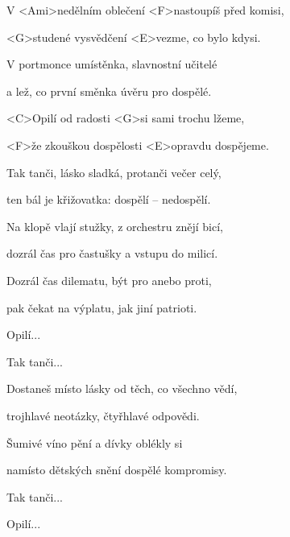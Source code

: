 

\zs
V <Ami>nedělním oblečení <F>nastoupíš před komisi,

<G>studené vysvědčení <E>vezme, co bylo kdysi.
\ks

\zs
V portmonce umístěnka, slavnostní učitelé

a lež, co první směnka úvěru pro dospělé.
\ks

\zr
<C>Opilí od radosti <G>si sami trochu lžeme,

<F>že zkouškou dospělosti <E>opravdu dospějeme.
\kr

\zr
Tak tanči, lásko sladká, protanči večer celý,

ten bál je křižovatka: dospělí -- nedospělí.
\kr

\zs
Na klopě vlají stužky, z orchestru znějí bicí,

dozrál čas pro častušky a vstupu do milicí.
\ks

\zs
Dozrál čas dilematu, být pro anebo proti,

pak čekat na výplatu, jak jiní patrioti.
\ks

\zr Opilí... \kr

\zr Tak tanči... \kr

\zs
Dostaneš místo lásky od těch, co všechno vědí,

trojhlavé neotázky, čtyřhlavé odpovědi.
\ks

\zr
Šumivé víno pění a dívky oblékly si

namísto dětských snění dospělé kompromisy.
\kr

\zr Tak tanči... \kr

\zr Opilí... \kr

\kp


















